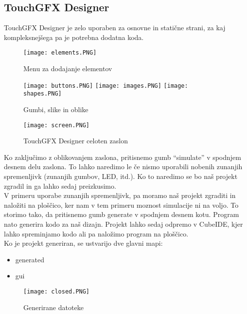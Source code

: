 \documentclass{article}
\begin{document}
\subsection{TouchGFX Designer}
\noindent
TouchGFX Designer je zelo uporaben za osnovne in stati\v{c}ne
strani, za kaj kompleksnej\v{s}ega pa je potrebna
dodatna koda. \\

\begin{figure}[H] %
  \centering
  \texttt{[image: elements.PNG]}
  \caption{Menu za dodajanje elementov}
\end{figure}

\begin{figure}[H] %
  \centering
  \texttt{[image: buttons.PNG]}
  \texttt{[image: images.PNG]}
  \texttt{[image: shapes.PNG]}
  \caption{Gumbi, slike in oblike}
\end{figure}

\begin{figure}[H] %
  \centering
  \texttt{[image: screen.PNG]}
  \caption{TouchGFX Designer celoten zaslon}
\end{figure}

\noindent
Ko zaklju\v{c}imo z oblikovanjem zaslona, pritisnemo gumb ``simulate''
v spodnjem desnem delu zaslona. To lahko naredimo le \v{c}e nismo
uporabili nobenih zunanjih spremenljivk (zunanjih gumbov, LED, itd.).
Ko to naredimo se bo na\v{s} projekt zgradil in ga lahko sedaj
preizkusimo. \\
V primeru uporabe zunanjih spremenljivk, pa
moramo na\v{s} projekt zgraditi in nalo\v{z}iti na plo\v{s}\v{c}ico,
ker nam v tem primeru moznost simulacije ni na voljo. To storimo tako,
da pritisnemo gumb generate v spodnjem desnem kotu.
Program nato generira kodo za na\v{s} dizajn. Projekt lahko sedaj
odpremo v CubeIDE, kjer lahko spreminjamo kodo ali pa nalo\v{z}imo
program na plo\v{s}\v{c}ico. \\

\noindent
Ko je projekt generiran, se ustvarijo dve glavni mapi:
\begin{itemize}
    \item generated
    \item gui
\end{itemize}

\begin{figure}[H] %
  \centering
  \texttt{[image: closed.PNG]}
  \caption{Generirane datoteke}
\end{figure}
\end{document}
